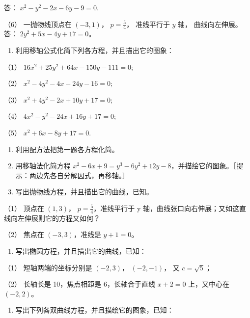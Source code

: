 答： \(x^{2} - y^{2} - 2x - 6y - 9 = 0.\)

（6） 一抛物线顶点在 \((-3, 1)\)， \(p = \frac{5}{4}\)， 准线平行于
\(y\) 轴， 曲线向左伸展。 答： \(2y^{2} + 5x - 4y + 17 = 0\)。

\begin{enumerate}
\def\labelenumi{\arabic{enumi}.}
\tightlist
\item
  利用移轴公式化简下列各方程，并且描出它的图象：
\end{enumerate}

（1） \(16x^{2} + 25y^{2} + 64x - 150y - 111 = 0;\)

（2） \(x^{2} - 4y^{2} - 4x - 24y - 16 = 0;\)

（3） \(x^{2} + 4y^{2} - 2x + 10y + 17 = 0;\)

（4） \(4x^{2} - y^{2} - 24x + 16y + 17 = 0;\)

（5） \(x^{2} + 6x - 8y + 17 = 0.\)

\begin{enumerate}
\def\labelenumi{\arabic{enumi}.}
\setcounter{enumi}{1}
\item
  利用配方法把第一题各方程化简。
\item
  用移轴法化简方程
  \(x^{2} - 6x + 9 = y^{3} - 6y^{2} + 12y - 8\)，并描绘它的图象。［提示：两边先各自分解因式，再移轴。］
\item
  写出抛物线方程，并且描出它的曲线，已知。
\end{enumerate}

（1） 顶点在 \((1, 3)\)， \(p=\frac{5}{4}\)，准线平行于 y
轴，曲线张口向右伸展；又如这直线向左伸展则它的方程又如何？

（2） 焦点在 \((-3, 3)\)，准线是 \(y+1=0\)。

\begin{enumerate}
\def\labelenumi{\arabic{enumi}.}
\setcounter{enumi}{4}
\tightlist
\item
  写出椭圆方程，并且描出它的曲线，已知：
\end{enumerate}

（1） 短轴两端的坐标分别是 \((-2, 3)\)， \((-2, -1)\)， 又
\(c = \sqrt{5}\)；

（2） 长轴长是 10，焦点相距是 6，长轴合于直线 \(x + 2 = 0\) 上，又中心在
\((-2, 2)\)。

\begin{enumerate}
\def\labelenumi{\arabic{enumi}.}
\setcounter{enumi}{5}
\tightlist
\item
  写出下列各双曲线方程，并且描绘它的图象，已知：
\end{enumerate}

